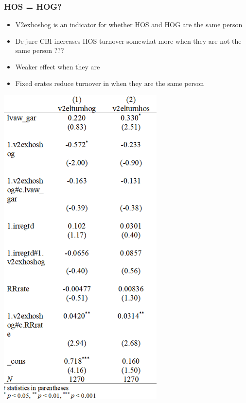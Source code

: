 \documentclass[]{beamer}
\begin{document}
\begin{frame}
    \frametitle{HOS = HOG?}
    \begin{itemize}
        \item V2exhoshog is an indicator for whether HOS and HOG are the same person
        \item De jure CBI increases HOS turnover somewhat more when they are not the same person ???
        \item Weaker effect when they are
        \item Fixed erates reduce turnover in when they are the same person
    \end{itemize}
    \includegraphics{img0009.png}
\end{frame}
\end{document}
